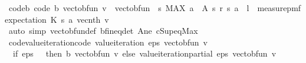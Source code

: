 \begin{isabellebody}
\endisatagproof
{\isafoldproof}%
%
\isadelimproof
\isanewline
%
\endisadelimproof
\isanewline
{}\isamarkupfalse%
\ code{\isacharunderscore}{\kern0pt}{\isasymL}\isactrlsub b\ {\isacharbrackleft}{\kern0pt}code{\isacharbrackright}{\kern0pt}{\isacharcolon}{\kern0pt}\ {\isachardoublequoteopen}{\isasymL}\isactrlsub b\ {\isacharparenleft}{\kern0pt}vec{\isacharunderscore}{\kern0pt}to{\isacharunderscore}{\kern0pt}bfun\ v{\isacharparenright}{\kern0pt}\ {\isacharequal}{\kern0pt}\ vec{\isacharunderscore}{\kern0pt}to{\isacharunderscore}{\kern0pt}bfun\ {\isacharparenleft}{\kern0pt}{\isasymchi}\ s{\isachardot}{\kern0pt}\ {\isacharparenleft}{\kern0pt}MAX\ a\ {\isasymin}\ A\ s{\isachardot}{\kern0pt}\ r\ {\isacharparenleft}{\kern0pt}s{\isacharcomma}{\kern0pt}\ a{\isacharparenright}{\kern0pt}\ {\isacharplus}{\kern0pt}\ l\ {\isacharasterisk}{\kern0pt}\ measure{\isacharunderscore}{\kern0pt}pmf{\isachardot}{\kern0pt}expectation\ {\isacharparenleft}{\kern0pt}K\ {\isacharparenleft}{\kern0pt}s{\isacharcomma}{\kern0pt}\ a{\isacharparenright}{\kern0pt}{\isacharparenright}{\kern0pt}\ {\isacharparenleft}{\kern0pt}vec{\isacharunderscore}{\kern0pt}nth\ v{\isacharparenright}{\kern0pt}{\isacharparenright}{\kern0pt}{\isacharparenright}{\kern0pt}{\isachardoublequoteclose}\isanewline
%
\isadelimproof
\ \ %
\endisadelimproof
%
\isatagproof
{}\isamarkupfalse%
\ {\isacharparenleft}{\kern0pt}auto\ simp{\isacharcolon}{\kern0pt}\ vec{\isacharunderscore}{\kern0pt}to{\isacharunderscore}{\kern0pt}bfun{\isacharunderscore}{\kern0pt}def\ {\isasymL}\isactrlsub b{\isacharunderscore}{\kern0pt}fin{\isacharunderscore}{\kern0pt}eq{\isacharunderscore}{\kern0pt}det\ A{\isacharunderscore}{\kern0pt}ne\ cSup{\isacharunderscore}{\kern0pt}eq{\isacharunderscore}{\kern0pt}Max{\isacharparenright}{\kern0pt}%
\endisatagproof
{\isafoldproof}%
%
\isadelimproof
\isanewline
%
\endisadelimproof
\isanewline
{}\isamarkupfalse%
\ code{\isacharunderscore}{\kern0pt}value{\isacharunderscore}{\kern0pt}iteration{\isacharbrackleft}{\kern0pt}code{\isacharbrackright}{\kern0pt}{\isacharcolon}{\kern0pt}\ {\isachardoublequoteopen}value{\isacharunderscore}{\kern0pt}iteration\ eps\ {\isacharparenleft}{\kern0pt}vec{\isacharunderscore}{\kern0pt}to{\isacharunderscore}{\kern0pt}bfun\ v{\isacharparenright}{\kern0pt}\ {\isacharequal}{\kern0pt}\ \isanewline
\ \ {\isacharparenleft}{\kern0pt}if\ eps\ {\isasymle}\ {}\ then\ {\isasymL}\isactrlsub b\ {\isacharparenleft}{\kern0pt}vec{\isacharunderscore}{\kern0pt}to{\isacharunderscore}{\kern0pt}bfun\ v{\isacharparenright}{\kern0pt}\ else\ value{\isacharunderscore}{\kern0pt}iteration{\isacharunderscore}{\kern0pt}partial\ eps\ {\isacharparenleft}{\kern0pt}vec{\isacharunderscore}{\kern0pt}to{\isacharunderscore}{\kern0pt}bfun\ v{\isacharparenright}{\kern0pt}{\isacharparenright}{\kern0pt}{\isachardoublequoteclose}\isanewline

\end{isabellebody}
